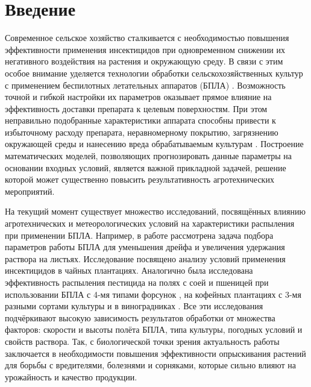 \chapter*{Введение} %


Современное сельское хозяйство сталкивается с необходимостью повышения эффективности применения инсектицидов при одновременном снижении их негативного воздействия на растения и окружающую среду. В связи с этим особое внимание уделяется технологии обработки сельскохозяйственных культур с применением беспилотных летательных аппаратов (БПЛА) \cite{Kurchenko2023}. Возможность точной и гибкой настройки их параметров оказывает прямое влияние на эффективность доставки препарата к целевым поверхностям. При этом неправильно подобранные характеристики аппарата способны привести к избыточному расходу препарата, неравномерному покрытию, загрязнению окружающей среды и нанесению вреда обрабатываемым культурам \cite{Yang2024}. Построение математических моделей, позволяющих прогнозировать данные параметры на основании входных условий, является важной прикладной задачей, решение которой может существенно повысить результативность агротехнических мероприятий.


На текущий момент существует множество исследований, посвящённых влиянию агротехнических и метеорологических условий на характеристики распыления при применении БПЛА. Например, в работе \cite{Liu2025} рассмотрена задача подбора параметров работы БПЛА для уменьшения дрейфа и увеличения удержания раствора на листьях. Исследование \cite{Wu2025} посвящено анализу условий применения инсектицидов в чайных плантациях. Аналогично была исследована эффективность распыления пестицида на полях с соей и пшеницей при использовании БПЛА с 4-мя типами форсунок \cite{Lopes2023}, на кофейных плантациях с 3-мя разными сортами культуры \cite{Vitoria2022} и в виноградниках \cite{Biglia2022}. Все эти исследования подчёркивают высокую зависимость результатов обработки от множества факторов: скорости и высоты полёта БПЛА, типа культуры, погодных условий и свойств раствора. Так, с биологической точки зрения актуальность работы заключается в необходимости повышения эффективности опрыскивания растений для борьбы с вредителями, болезнями и сорняками, которые сильно влияют на урожайность и качество продукции.


